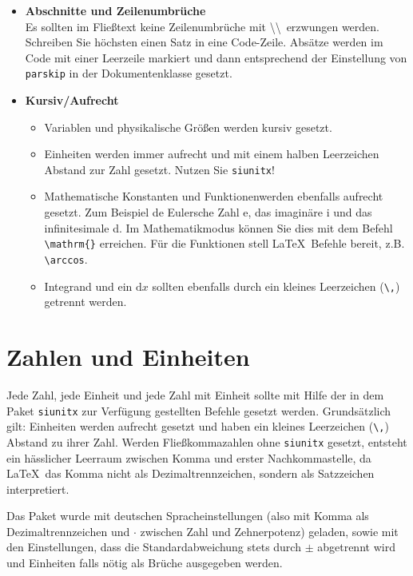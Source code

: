 \begin{itemize}
    \item \textbf{Abschnitte und Zeilenumbrüche} \\
        Es sollten im Fließtext keine Zeilenumbrüche mit \textbackslash\textbackslash \ erzwungen werden.
        Schreiben Sie höchsten einen Satz in eine Code-Zeile.
        Absätze werden im Code mit einer Leerzeile markiert und dann entsprechend der Einstellung von \texttt{parskip} in der Dokumentenklasse gesetzt.
    \item \textbf{Kursiv/Aufrecht} \\
        \begin{itemize}
            \item Variablen und physikalische Größen werden kursiv gesetzt. 
            \item Einheiten werden immer aufrecht und mit einem halben Leerzeichen Abstand zur Zahl gesetzt. Nutzen Sie \texttt{siunitx}!
            \item Mathematische Konstanten und Funktionenwerden ebenfalls aufrecht gesetzt. Zum Beispiel de Eulersche Zahl e, das imaginäre i und das infinitesimale d.
                Im Mathematikmodus können Sie dies mit dem Befehl \verb_\mathrm{}_ erreichen. Für die Funktionen stell \LaTeX \ Befehle bereit, z.B. \verb+\arccos+.
            \item Integrand und ein $\mathrm{d}x$ sollten ebenfalls durch ein kleines Leerzeichen (\verb+\,+) getrennt werden.
        \end{itemize}
        


\end{itemize}

\section{Zahlen und Einheiten}

Jede Zahl, jede Einheit und jede Zahl mit Einheit sollte mit Hilfe der in dem Paket \texttt{siunitx} zur Verfügung gestellten Befehle gesetzt werden.
Grundsätzlich gilt: Einheiten werden aufrecht gesetzt und haben ein kleines Leerzeichen (\verb+\,+) Abstand zu ihrer Zahl. 
Werden Fließkommazahlen ohne \texttt{siunitx} gesetzt, entsteht ein hässlicher Leerraum zwischen Komma und erster Nachkommastelle, da \LaTeX \ das Komma nicht als Dezimaltrennzeichen, sondern als Satzzeichen interpretiert.

Das Paket wurde mit deutschen Spracheinstellungen (also mit Komma als Dezimaltrennzeichen und $\cdot$ zwischen Zahl und Zehnerpotenz) geladen, sowie mit den Einstellungen, dass die Standardabweichung stets durch $\pm$ abgetrennt wird und Einheiten falls nötig als Brüche ausgegeben werden.

